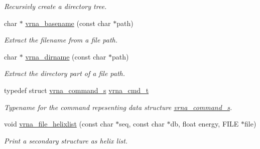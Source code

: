 \begin{DoxyCompactItemize}
\begin{DoxyCompactList}\small\item\em Recursivly create a directory tree. \end{DoxyCompactList}\item 
char $\ast$ \hyperlink{group__file__utils_ga8d0f8f84f1e2628172cf3c8648b2e507}{vrna\+\_\+basename} (const char $\ast$path)\hypertarget{group__file__utils_ga8d0f8f84f1e2628172cf3c8648b2e507}{}\label{group__file__utils_ga8d0f8f84f1e2628172cf3c8648b2e507}

\begin{DoxyCompactList}\small\item\em Extract the filename from a file path. \end{DoxyCompactList}\item 
char $\ast$ \hyperlink{group__file__utils_gae006d31b088d52d8aace86948def5fe8}{vrna\+\_\+dirname} (const char $\ast$path)\hypertarget{group__file__utils_gae006d31b088d52d8aace86948def5fe8}{}\label{group__file__utils_gae006d31b088d52d8aace86948def5fe8}

\begin{DoxyCompactList}\small\item\em Extract the directory part of a file path. \end{DoxyCompactList}\end{DoxyCompactItemize}
\begin{DoxyCompactItemize}
\item 
typedef struct \hyperlink{structvrna__command__s}{vrna\+\_\+command\+\_\+s} \hyperlink{group__file__utils_ga92cb3b5952352b103bcb32e5a99e0e5a}{vrna\+\_\+cmd\+\_\+t}\hypertarget{group__file__utils_ga92cb3b5952352b103bcb32e5a99e0e5a}{}\label{group__file__utils_ga92cb3b5952352b103bcb32e5a99e0e5a}

\begin{DoxyCompactList}\small\item\em Typename for the command repesenting data structure \hyperlink{structvrna__command__s}{vrna\+\_\+command\+\_\+s}. \end{DoxyCompactList}\end{DoxyCompactItemize}
\begin{DoxyCompactItemize}
\item 
void \hyperlink{group__file__utils_gaaface7db12fadc3d271641c4515ab6e4}{vrna\+\_\+file\+\_\+helixlist} (const char $\ast$seq, const char $\ast$db, float energy, F\+I\+LE $\ast$file)
\begin{DoxyCompactList}\small\item\em Print a secondary structure as helix list. \end{DoxyCompactList}\end{DoxyCompactItemize}


